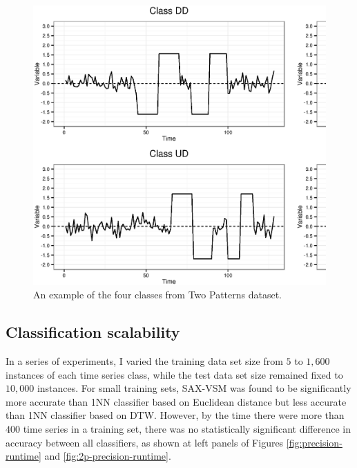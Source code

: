 \begin{figure}[t]
   \centering
   \includegraphics[width=140mm]{figures/2patterns.ps}
   \caption{An example of the four classes from Two Patterns dataset.}
   \label{fig:2patterns}
\end{figure}

\subsection{Classification scalability}
In a series of experiments, I varied the training data set size from $5$ to $1,600$ instances of each time series class, 
while the test data set size remained fixed to $10,000$ instances. 
For small training sets, SAX-VSM was found to be significantly more accurate than 1NN classifier based on Euclidean 
distance but less accurate than 1NN classifier based on DTW. 
However, by the time there were more than $400$ time series in a training set, there was no statistically 
significant difference in accuracy between all classifiers, 
as shown at left panels of Figures \ref{fig:precision-runtime} and \ref{fig:2p-precision-runtime}. 

